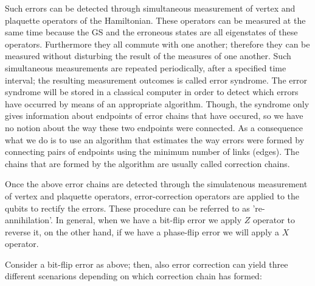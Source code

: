 \documentclass[12pt]{report}
\begin{document}
\begin{minipage}{1 \textwidth}
		
		Such errors can be detected through  simultaneous measurement of vertex and plaquette operators of the Hamiltonian. These operators can be measured at the same time because the GS and the erroneous states are all eigenstates of these operators. Furthermore they all commute with one another; therefore they can be measured without disturbing the result of the measures of one another.
		Such simultaneous measurements are repeated periodically, after a specified time interval; the resulting measurement outcomes is called error syndrome. The error syndrome will be stored in a classical computer in order to detect which errors have occurred by means of an appropriate algorithm. Though, the syndrome only gives information about endpoints of error chains that have occured, so we have no notion about the way these two endpoints were connected. As a consequence what we do is to use an algorithm that estimates the way errors were formed by connecting pairs of endpoints using the minimum number of links (edges). The chains that are formed by the algorithm are usually called correction chains. \newline
		
		Once the above error chains are detected through the simulatenous measurement of vertex and plaquette operators, error-correction operators  are applied to the qubits to rectify the errors. These procedure can be referred to as 're-annihilation'. In general, when we have a bit-flip error we apply $Z$ operator to reverse it, on the other hand, if we have a phase-flip error we will apply a $X$ operator. \newline
		
		Consider a bit-flip error as above; then, also error correction can yield three different scenarions depending on which correction chain has formed: \newline
	
		
		

		
		
		
	\end{minipage}
	
\end{document}
